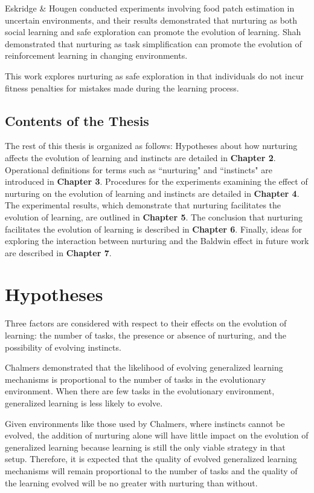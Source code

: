 \documentclass[master]{outhesis}
\begin{document}
Eskridge \& Hougen \cite{eskridge-learning-uncertain-environments} conducted experiments involving food patch estimation in uncertain environments, and their results demonstrated that nurturing as both social learning and safe exploration can promote the evolution of learning. Shah \cite{Shah:2015hs} demonstrated that nurturing as task simplification can promote the evolution of reinforcement learning in changing environments.

This work explores nurturing as safe exploration in that individuals do not incur fitness penalties for mistakes made during the learning process.

\section{Contents of the Thesis}

The rest of this thesis is organized as follows:
Hypotheses about how nurturing affects the evolution of learning and instincts are detailed in \textbf{Chapter 2}. 
Operational definitions for terms such as ``nurturing" and ``instincts" are introduced in \textbf{Chapter 3}.
Procedures for the experiments examining the effect of nurturing on the evolution of learning and instincts are detailed in \textbf{Chapter 4}.
The experimental results, which demonstrate that nurturing facilitates the evolution of learning, are outlined in \textbf{Chapter 5}. 
The conclusion that nurturing facilitates the evolution of learning is described in \textbf{Chapter 6}. 
Finally, ideas for exploring the interaction between nurturing and the Baldwin effect in future work are described in \textbf{Chapter 7}.

\chapter{Hypotheses}

Three factors are considered with respect to their effects on the evolution of learning: the number of tasks, the presence or absence of nurturing, and the possibility of evolving instincts.

Chalmers demonstrated that the likelihood of evolving generalized learning mechanisms is proportional to the number of tasks in the evolutionary environment. When there are few tasks in the evolutionary environment, generalized learning is less likely to evolve.

Given environments like those used by Chalmers, where instincts cannot be evolved, the addition of nurturing alone will have little impact on the evolution of generalized learning because learning is still the only viable strategy in that setup. Therefore, it is expected that the quality of evolved generalized learning mechanisms will remain proportional to the number of tasks and the quality of the learning evolved will be no greater with nurturing than without.
\end{document}
